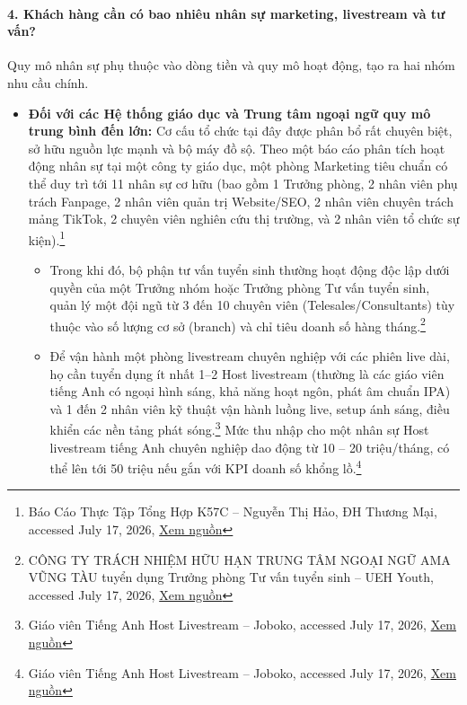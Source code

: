 \paragraph{4. Khách hàng cần có bao nhiêu nhân sự marketing, livestream và tư vấn?}

Quy mô nhân sự phụ thuộc vào dòng tiền và quy mô hoạt động, tạo ra hai nhóm nhu cầu chính.

\begin{itemize}
    \item \textbf{Đối với các Hệ thống giáo dục và Trung tâm ngoại ngữ quy mô trung bình đến lớn:} Cơ cấu tổ chức tại đây được phân bổ rất chuyên biệt, sở hữu nguồn lực mạnh và bộ máy đồ sộ. Theo một báo cáo phân tích hoạt động nhân sự tại một công ty giáo dục, một phòng Marketing tiêu chuẩn có thể duy trì tới 11 nhân sự cơ hữu (bao gồm 1 Trưởng phòng, 2 nhân viên phụ trách Fanpage, 2 nhân viên quản trị Website/SEO, 2 nhân viên chuyên trách mảng TikTok, 2 chuyên viên nghiên cứu thị trường, và 2 nhân viên tổ chức sự kiện).\footnote{Báo Cáo Thực Tập Tổng Hợp K57C -- Nguyễn Thị Hảo, ĐH Thương Mại, accessed July 17, 2026, \href{https://www.studocu.vn/vn/document/truong-dai-hoc-thuong-mai/phan-tich-bctc/27lop57c2nguyen-thi-hao-bctttn/107980845}{Xem nguồn}}

    \begin{itemize}
        \item Trong khi đó, bộ phận tư vấn tuyển sinh thường hoạt động độc lập dưới quyền của một Trưởng nhóm hoặc Trưởng phòng Tư vấn tuyển sinh, quản lý một đội ngũ từ 3 đến 10 chuyên viên (Telesales/Consultants) tùy thuộc vào số lượng cơ sở (branch) và chỉ tiêu doanh số hàng tháng.\footnote{CÔNG TY TRÁCH NHIỆM HỮU HẠN TRUNG TÂM NGOẠI NGỮ AMA VŨNG TÀU tuyển dụng Trưởng phòng Tư vấn tuyển sinh -- UEH Youth, accessed July 17, 2026, \href{https://youth.ueh.edu.vn/ho-tro-sinh-vien-2/cong-ty-trach-nhiem-huu-han-trung-tam-ngoai-ngu-ama-vung-tau-tuyen-dung-truong-phong-tu-van-tuyen-sinh/}{Xem nguồn}}

        \item Để vận hành một phòng livestream chuyên nghiệp với các phiên live dài, họ cần tuyển dụng ít nhất 1--2 Host livestream (thường là các giáo viên tiếng Anh có ngoại hình sáng, khả năng hoạt ngôn, phát âm chuẩn IPA) và 1 đến 2 nhân viên kỹ thuật vận hành luồng live, setup ánh sáng, điều khiển các nền tảng phát sóng.\footnote{Giáo viên Tiếng Anh Host Livestream -- Joboko, accessed July 17, 2026, \href{https://vn.joboko.com/viec-lam/giao-vien-tieng-anh-host-livestream-xvi6575019?amp=1}{Xem nguồn}} Mức thu nhập cho một nhân sự Host livestream tiếng Anh chuyên nghiệp dao động từ 10 -- 20 triệu/tháng, có thể lên tới 50 triệu nếu gắn với KPI doanh số khổng lồ.\footnote{Giáo viên Tiếng Anh Host Livestream -- Joboko, accessed July 17, 2026, \href{https://vn.joboko.com/viec-lam/giao-vien-tieng-anh-host-livestream-xvi6575019}{Xem nguồn}}
    \end{itemize}


\end{itemize}
